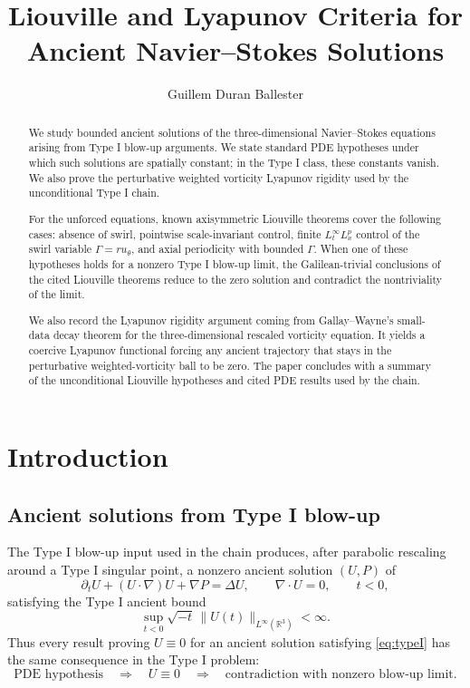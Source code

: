 \documentclass[11pt]{amsart}
\title[Ancient Navier--Stokes criteria]
{Liouville and Lyapunov Criteria for Ancient Navier--Stokes Solutions}
\author{Guillem Duran Ballester}
\date{}
\theoremstyle{plain}
\theoremstyle{definition}
\theoremstyle{remark}
\numberwithin{equation}{section}
\begin{document}
\begin{abstract}
We study bounded ancient solutions of the three-dimensional Navier--Stokes
equations arising from Type I blow-up arguments.  We state standard PDE
hypotheses under which such solutions are spatially constant; in the Type I
class, these constants vanish.  We also prove the perturbative weighted
vorticity Lyapunov rigidity used by the unconditional Type I chain.

For the unforced equations, known axisymmetric Liouville theorems cover the
following cases: absence of swirl, pointwise scale-invariant control, finite
\(L_t^\infty L_x^p\) control of the swirl variable \(\Gamma=ru_\theta\), and
axial periodicity with bounded \(\Gamma\).  When one of these hypotheses holds
for a nonzero Type I blow-up limit, the Galilean-trivial conclusions of the
cited Liouville theorems reduce to the zero solution and contradict the
nontriviality of the limit.

We also record the Lyapunov rigidity argument coming from Gallay--Wayne's
small-data decay theorem for the three-dimensional rescaled vorticity equation.
It yields a coercive Lyapunov functional forcing any ancient trajectory that
stays in the perturbative weighted-vorticity ball to be zero.  The paper concludes
with a summary of the unconditional Liouville hypotheses and cited PDE results
used by the chain.
\end{abstract}

\maketitle

\section{Introduction}

\subsection{Ancient solutions from Type I blow-up}

The Type I blow-up input used in the chain produces, after parabolic rescaling
around a Type I singular point, a nonzero ancient solution \((U,P)\) of
\begin{equation}\label{eq:NS}
   \partial_tU+(U\cdot\nabla)U+\nabla P=\Delta U,
   \qquad \nabla\cdot U=0,
   \qquad t<0,
\end{equation}
satisfying the Type I ancient bound
\begin{equation}\label{eq:typeI}
   \sup_{t<0}\sqrt{-t}\,
   \|U(t)\|_{L^\infty(\mathbb R^3)}<\infty .
\end{equation}
Thus every result proving \(U\equiv0\) for an ancient solution satisfying
\eqref{eq:typeI} has the same consequence in the Type I problem:
\[
   \text{PDE hypothesis}
   \quad\Longrightarrow\quad
   U\equiv0
   \quad\Longrightarrow\quad
   \text{contradiction with nonzero blow-up limit}.
\]
\end{document}
